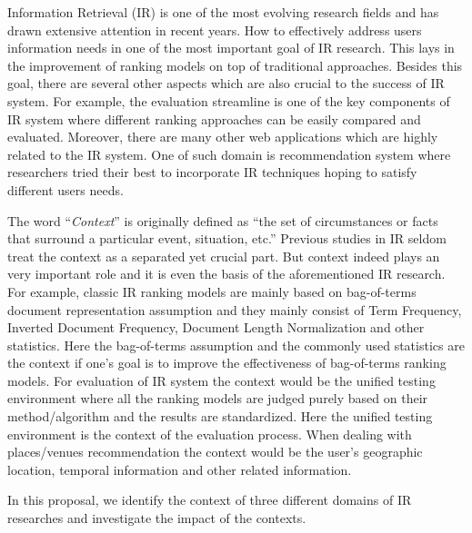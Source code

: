 %
%
Information Retrieval (IR) is one of the most evolving research fields 
and has drawn extensive attention in recent years. 
How to effectively address users information needs in one of the most 
important goal of IR research. This lays in the improvement of ranking 
models on top of traditional approaches. Besides this goal, there 
are several other aspects which are also crucial to the success of IR 
system. For example, the evaluation streamline is one of the key 
components of IR system where different ranking approaches can be 
easily compared and evaluated. 
Moreover, there are many other web applications which 
are highly related to the IR system. One of such domain is recommendation 
system where researchers tried their best to incorporate IR techniques 
hoping to satisfy different users needs.

The word ``\textit{Context}'' is originally defined as ``the set of circumstances or facts that surround a particular event, situation, etc.'' 
Previous studies in IR seldom treat the context as a separated yet 
crucial part. But context indeed plays an very important role and it 
is even the basis of the aforementioned IR research.
For example, classic IR ranking models are mainly based on 
bag-of-terms document representation assumption and they mainly 
consist of Term Frequency, Inverted Document Frequency, Document Length 
Normalization and other statistics. Here the bag-of-terms assumption 
and the commonly used statistics are the context if one's goal is to 
improve the effectiveness of bag-of-terms ranking models. 
For evaluation of IR system the context would be the unified testing 
environment where all the ranking models are judged purely based on 
their method/algorithm and the results are standardized. Here the unified 
testing environment is the context of the evaluation process. 
When dealing with places/venues recommendation the context would be the 
user's geographic location, temporal information and other related 
information. 

In this proposal, we identify the context of three different domains 
of IR researches and investigate the impact of the contexts.  


